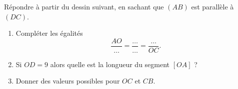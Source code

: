 
\begin{exercice}\label{exo2smath-0159}

    \begin{multicols}{2}
    Répondre à partir du dessin suivant, en sachant que \( (AB)\) est parallèle à \( (DC)\).
    \begin{enumerate}
        \item
            Compléter les égalités
            \begin{equation}
                \frac{ AO }{ \ldots }=\frac{ \ldots }{ \ldots }=\frac{ \ldots }{ OC }.
            \end{equation}
        \item
            Si \( OD=9\) alors quelle est la longueur du segment \( [OA]\) ?
        \item\label{ItemVAFNooUXPciH}
            Donner des valeurs possibles pour \( OC\) et \( CB\).
    \end{enumerate}
    \columnbreak
    \begin{center}

    \end{center}
    \end{multicols}

\end{exercice}

